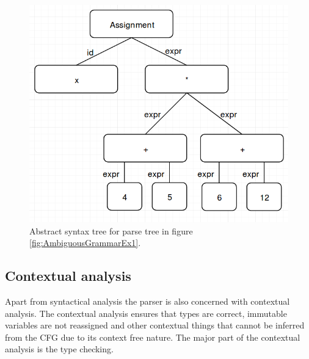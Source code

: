 \begin{figure}[H]
	\centering
	\includegraphics[width=\textwidth/2+\textwidth/4]{3.Theory/images/ast.png}
	\caption{
		Abstract syntax tree for parse tree in figure \ref{fig:AmbiguousGrammarEx1}.
	}
	\label{fig:ast}
\end{figure}

%

\subsection{Contextual analysis}

Apart from syntactical analysis the parser is also concerned with contextual analysis. 
The contextual analysis ensures that types are correct, immutable variables are not reassigned and other contextual things that cannot be inferred from the CFG due to its context free nature. 
The major part of the contextual analysis is the type checking.

